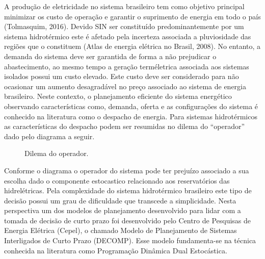 \documentclass[12pt,fleqn]{article}
\begin{document}
 A produ\c c\~ao de eletricidade no sistema brasileiro tem como objetivo principal minimizar
os custo de opera\c c\~ao e garantir o suprimento de energia em todo o pa\'is (Tolmasquim, 2016). Devido SIN ser
constitu\'ido predominantemente por um sistema hidrot\'ermico este \'e afetado pela incerteza associada a pluviosidade
das regi\~oes que o constituem (Atlas de
energia el\'etrica no Brasil, 2008). No entanto, a demanda do sistema deve ser garantida de forma a n\~ao prejudicar o
abastecimento, ao mesmo tempo a gera\c c\~ao term\'eletrica associada aos sistemas isolados possui um custo elevado. Este custo deve ser considerado para n\~ao ocasionar um
aumento desagrad\'avel no pre\c co  associado ao sistema de energia brasileiro. 
Neste contexto, o planejamento eficiente do sistema energ\'etico observando caracter\'isticas como, demanda, oferta e
  as configura\c c\~oes do sistema \'e conhecido na literatura como o despacho de energia. Para sistemas
 hidrot\'ermicos as caracter\'isticas do despacho podem ser resumidas no dilema do
 ``operador'' dado pelo diagrama a seguir.
 {\setlength{\jot}{2pt}
 \begin{figure}[!h]
 \centering
 \caption {Dilema do operador.}  
 \label{fig1}
 \end{figure}
}
Conforme o diagrama o operador do sistema pode ter preju\'izo associado a sua escolha dado o componente estocastico
relacionado aos
reservat\'orios das hidrel\'etricas. Pela complexidade do sistema hidrot\'ermico
brasileiro este tipo de decis\~ao possui um grau de dificuldade que transcede a simplicidade. Nesta perspectiva um dos modelos de
planejamento desenvolvido para lidar com a tomada de decis\~ao de curto prazo foi desenvolvido pelo Centro de
Pesquisas de Energia El\'etrica (Cepel), o chamado Modelo de Planejamento de Sistemas Interligados de
Curto Prazo (DECOMP). Esse modelo fundamenta-se na t\'ecnica conhecida na literatura como Programa\c c\~ao Din\^amica
Dual Estoc\'astica.
\end{document}

